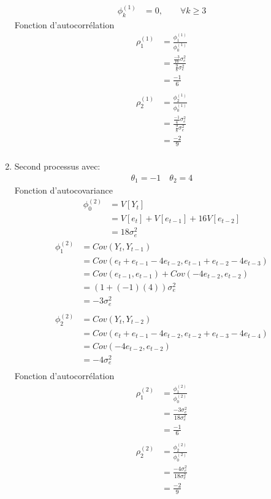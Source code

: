 \documentclass{article}
\begin{document}
\begin{enumerate}
\begin{align*}
\end{align*}
\begin{align*}
\phi_k^{(1)} &= 0, \qquad \forall k \geq 3
\end{align*}
Fonction d'autocorrélation
\begin{align*}
\rho_1^{(1)} &= \frac{\phi_1^{(1)}}{\phi_0^{(1)}} \\
&= \frac{\frac{-3}{16}\sigma^2_e}{\frac{9}{8}\sigma^2_e} \\
&= \frac{-1}{6} \\
\end{align*}
\begin{align*}
\rho_2^{(1)} &= \frac{\phi_2^{(1)}}{\phi_0^{(1)}} \\
&= \frac{\frac{-1}{4}\sigma^2_e}{\frac{9}{8}\sigma^2_e} \\
&= \frac{-2}{9} \\
\end{align*}
\item Second processus avec:
\begin{align*}
\theta_1 = -1 \quad \theta_2 = 4
\end{align*}
Fonction d'autocovariance
\begin{align*}
\phi_0^{(2)} &= V[Y_t] \\
&= V[e_t]+V[e_{t-1}]+16V[e_{t-2}] \\
&= 18 \sigma^2_e
\end{align*}
\begin{align*}
\phi_1^{(2)} &= Cov(Y_t,Y_{t-1}) \\
&= Cov(e_t + e_{t-1} - 4e_{t-2}, e_{t-1} + e_{t-2} - 4e_{t-3}) \\
&= Cov(e_{t-1},e_{t-1}) + Cov(-4e_{t-2},e_{t-2}) \\
&= (1 + (-1)(4))\sigma^2_e \\
&= -3\sigma^2_e \\
\end{align*}
\begin{align*}
\phi_2^{(2)} &= Cov(Y_t,Y_{t-2}) \\
&= Cov(e_t + e_{t-1} - 4e_{t-2}, e_{t-2} + e_{t-3} - 4e_{t-4} )\\
&= Cov(- 4e_{t-2},e_{t-2}) \\
&= -4\sigma^2_e \\
\end{align*}
Fonction d'autocorrélation
\begin{align*}
\rho_1^{(2)} &= \frac{\phi_1^{(2)}}{\phi_0^{(2)}} \\
&= \frac{-3\sigma^2_e}{18\sigma^2_e} \\
&= \frac{-1}{6} \\
\end{align*}
\begin{align*}
\rho_2^{(2)} &= \frac{\phi_2^{(2)}}{\phi_0^{(2)}} \\
&= \frac{-4\sigma^2_e}{18\sigma^2_e} \\
&= \frac{-2}{9} \\
\end{align*}
\end{enumerate}
\end{document}
